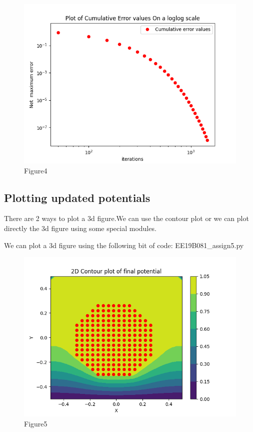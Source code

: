 \documentclass[11pt, a4paper]{article}
\begin{document}
\begin{figure}[!tbh]
\centering
\includegraphics[scale=0.45]{Assgn5_plot4.png} 
\caption{Figure4}
\label{fig4}
\end{figure}

\subsection*{Plotting updated potentials}

There are 2 ways to plot a 3d figure.We can use the contour plot or we can plot directly the 3d figure using some special modules.

We can plot a 3d figure using the following bit of code:
 {EE19B081_assign5.py}

\begin{figure}[!tbh]
\centering
\includegraphics[scale=0.5]{Assgn5_plot5.png} 
\caption{Figure5}
\label{fig5}
\end{figure}
\end{document}
